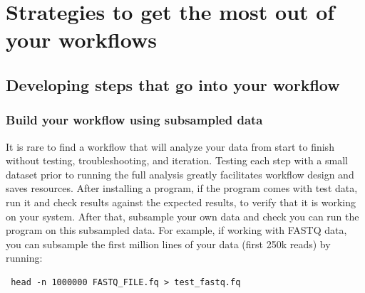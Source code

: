 \documentclass[10pt,letterpaper]{article}
\begin{document}
\begin{greybox}
{%


}
\end{greybox}


\section*{Strategies to get the most out of your workflows}

\subsection*{Developing steps that go into your workflow}

\subsubsection*{Build your workflow using subsampled data}

It is rare to find a workflow that will analyze your data from start to finish without testing, troubleshooting, and iteration.
Testing each step with a small dataset prior to running the full analysis greatly facilitates workflow design and saves resources.
After installing a program, if the program comes with test data, run it and check results against the expected results, to verify that it is working on your system. 
After that, subsample your own data and check you can run the program on this subsampled data. 
For example, if working with FASTQ data, you can subsample the first million lines of your data (first 250k reads) by running:

 \begin{lstlisting}
 head -n 1000000 FASTQ_FILE.fq > test_fastq.fq 
\end{lstlisting}
\end{document}
